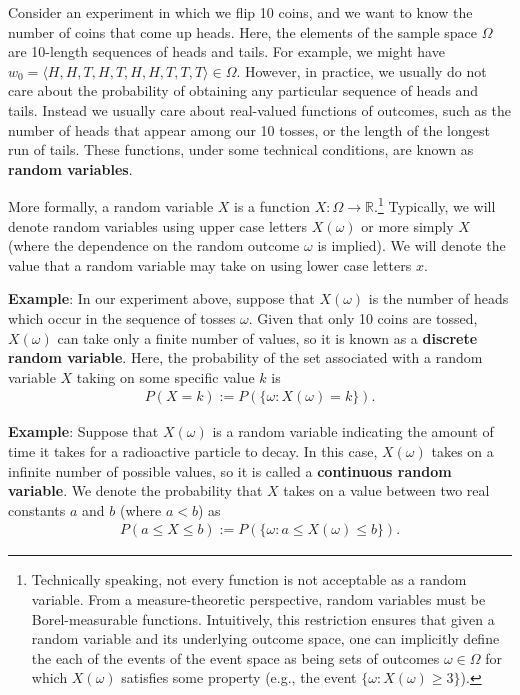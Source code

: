 \documentclass{article}
\begin{document}
Consider an experiment in which we flip 10 coins, and we want to know the
number of coins that come up heads.  Here, the elements of the sample
space $\Omega$ are 10-length sequences of heads and tails.  For example,
we might have $w_0 = \langle H, H, T, H, T, H, H, T, T, T \rangle \in
\Omega$.  However, in practice, we usually do not care about the
probability of obtaining any particular sequence of heads and tails.
Instead we usually care about real-valued functions of outcomes, such as the
number of heads that appear among our 10 tosses, or the
length of the longest run of tails.  These functions, under some
technical conditions, are known as \textbf{random variables}.

More formally, a random variable $X$ is a function $X:\Omega
\longrightarrow \mathbb{R}$.\footnote{ Technically speaking, not every
  function is not acceptable as a random variable.  From a
  measure-theoretic perspective, random variables must be
  Borel-measurable functions.  Intuitively, this restriction ensures
  that given a random variable and its underlying outcome space, one
  can implicitly define the each of the events of the event space as
  being sets of outcomes $\omega \in \Omega$ for which $X(\omega)$
  satisfies some property (e.g., the event $\{\omega : X(\omega) \ge 3 \}$).
} Typically, we will denote random
variables using upper case letters $X(\omega)$ or more simply $X$
(where the dependence on the random outcome $\omega$ is implied).  We
will denote the value that a random variable may take on using lower
case letters $x$.

\textbf{Example}: In our experiment above, suppose that $X(\omega)$ is
the number of heads which occur in the sequence of tosses $\omega$.
Given that only 10 coins are tossed, $X(\omega)$ can take only a
finite number of values, so it is known as a \textbf{discrete random
variable}. Here, the probability of the set associated with a random
variable $X$ taking on some specific value $k$ is
\begin{eqnarray*}
  P(X = k) := P(\{\omega : X(\omega) = k\}).
\end{eqnarray*}

\textbf{Example}: Suppose that $X(\omega)$ is a random variable
indicating the amount of time it takes for a radioactive particle to
decay.  In this case, $X(\omega)$ takes on a infinite number of
possible values, so it is called a \textbf{continuous random
variable}.  We denote the probability that $X$ takes on a value between 
two real constants $a$ and $b$ (where $a < b$) as 
\begin{eqnarray*}
  P(a \le X \le b) := P(\{\omega : a \le X(\omega) \le b\}).
\end{eqnarray*}
\end{document}
